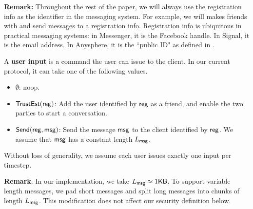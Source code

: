 \textbf{Remark: }Throughout the rest of the paper, we will always use the registration info as the identifier in the messaging system. For example, we will makes friends with and send messages to a registration info. Registration info is ubiquitous in practical messaging systems: in Messenger, it is the Facebook handle. In Signal, it is the email address. In Anysphere, it is the ``public ID" as defined in \cite[Figure 6]{whitepaper}.
\begin{definition}
\label{defn:user-input}
A \textbf{user input} is a command the user can issue to the client. In our current protocol, it can take one of the following values.
\begin{itemize}
    \item $\emptyset$: noop.
    \item $\mathsf{TrustEst}(\mathsf{reg})$: Add the user identified by $\mathsf{reg}$ as a friend, and enable the two parties to start a conversation.
    \item $\mathsf{Send}(\mathsf{reg}, \mathsf{msg})$: Send the message $\mathsf{msg}$ to the client identified by $\mathsf{reg}$. We assume that $\mathsf{msg}$ has a constant length $L_{\mathsf{msg}}$.
\end{itemize}


Without loss of generality, we assume each user issues exactly one input per timestep.
\end{definition}
\textbf{Remark}:  In our implementation, we take $L_{\mathsf{msg}} \approx 1\mathsf{KB}$. To support variable length messages, we pad short messages and split long messages into chunks of length $L_{\mathsf{msg}}$. This modification does not affect our security definition below.
